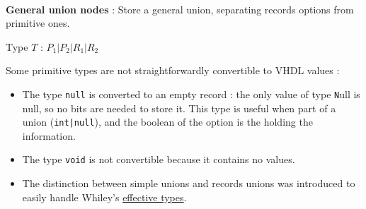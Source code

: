 \documentclass[10pt,a4paper]{article}
\newcommand{\code}{\texttt}
\begin{document}
\begin{itemize}
	\item[] 
	\begin{minipage}[b]{.95\textwidth}
		\begin{figure}
		\end{figure}
		~%
		\item \textbf{General union nodes} : Store a general union, separating records options from primitive ones.
		\begin{flushright}
			Type $T$ : $P_1|P_2|R_1|R_2$
		\end{flushright}
	\end{minipage} 
\end{itemize}


Some primitive types are not straightforwardly convertible to VHDL values :


\begin{itemize}
	\item The type \code {null} is converted to an empty record : the only value of type \code Null is null, so no bits are needed to store it. This type is useful when part of a union (\code {int|null}), and the boolean of the option is the holding the information.
	\item The type \code {void} is not convertible because it contains no values.
	\item The distinction between simple unions and records unions was introduced to easily handle Whiley's \hyperref[EffTypes]{effective types}.
\end{itemize}
\end{document}
